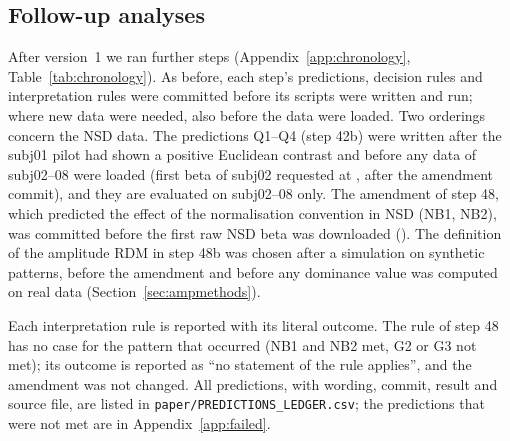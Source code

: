 \subsection{Follow-up analyses}
\label{sec:followup}

After version~1 we ran \AmendmentsFollowup{} further steps (Appendix~\ref{app:chronology}, Table~\ref{tab:chronology}). As before,
each step's predictions, decision rules and interpretation rules were committed before its scripts were
written and run; where new data were needed, also before the data were loaded. Two orderings concern
the NSD data. The predictions Q1--Q4 (step 42b) were written after the subj01 pilot had shown a
positive Euclidean contrast and before any data of subj02--08 were loaded (first beta of subj02
requested at \FirstDownloadSubjTwo, after the amendment commit), and they are evaluated on subj02--08
only. The amendment of step 48, which predicted the effect of the normalisation convention in NSD
(NB1, NB2), was committed before the first raw NSD beta was downloaded (\FirstDownloadRawFortyEight).
The definition of the amplitude RDM in step 48b was chosen after a simulation on synthetic patterns,
before the amendment and before any dominance value was computed on real data
(Section~\ref{sec:ampmethods}).

Each interpretation rule is reported with its literal outcome. The rule of step 48 has no case for the
pattern that occurred (NB1 and NB2 met, G2 or G3 not met); its outcome is reported as ``no statement of
the rule applies'', and the amendment was not changed. All predictions, with wording, commit, result
and source file, are listed in \texttt{paper/PREDICTIONS\_LEDGER.csv}; the predictions that were not
met are in Appendix~\ref{app:failed}.

